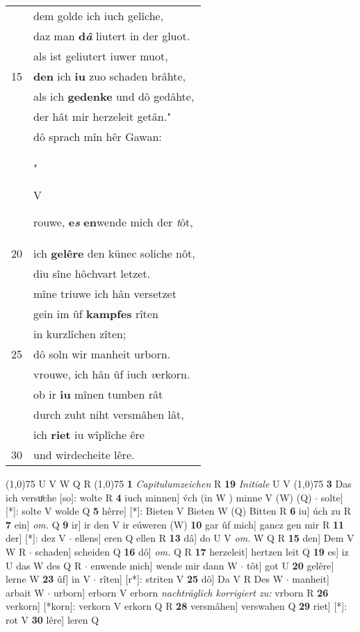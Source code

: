 \documentclass[8pt,a4paper,notitlepage]{article}
\begin{document}
\begin{table}[ht]
\begin{minipage}[t]{0.5\linewidth}
\begin{tabular}{rl}
 & dem golde ich iuch gelîche,\\ 
 & daz man \textbf{d\textit{â}} liutert in der gluot.\\ 
 & als ist geliutert iuwer muot,\\ 
15 & \textbf{den} ich \textbf{iu} zuo schaden brâhte,\\ 
 & als ich \textbf{gedenke} und dô gedâhte,\\ 
 & der hât mir herzeleit getân."\\ 
 & dô sprach mîn hêr Gawan:\\ 
 & "\begin{large}V\end{large}rouwe, \textbf{e\textit{s}} \textbf{en}wende mich der \textit{t}ôt,\\ 
20 & ich \textbf{gelêre} den künec soliche nôt,\\ 
 & diu sîne hôchvart letzet.\\ 
 & mîne triuwe ich hân versetzet\\ 
 & gein im ûf \textbf{kampfes} rîten\\ 
 & in kurzlîchen zîten;\\ 
25 & dô soln wir manheit urborn.\\ 
 & vrouwe, ich hân ûf iuch \textit{v}erkorn.\\ 
 & ob ir \textbf{iu} mînen tumben rât\\ 
 & durch zuht niht versmâhen lât,\\ 
 & ich \textbf{riet} iu wîplîche êre\\ 
30 & und wirdecheite lêre.\\ 
\end{tabular}
\scriptsize
\line(1,0){75} \newline
U V W Q R \newline
\line(1,0){75} \newline
\textbf{1} \textit{Capitulumzeichen} R  \textbf{19} \textit{Initiale} U V  \newline
\line(1,0){75} \newline
\textbf{3} Das ich versuͦche [so]: wolte R \textbf{4} iuch minnen] v́ch (in W ) minne V (W) (Q)  $\cdot$ solte] [*]: solte V wolde Q \textbf{5} hêrre] [*]: Bieten V Bieten W (Q) Bitten R \textbf{6} iu] úch zu R \textbf{7} ein] \textit{om.} Q \textbf{9} ir] ir den V ir eúweren (W) \textbf{10} gar ûf mich] gancz gen mir R \textbf{11} der] [*]: dez V  $\cdot$ ellens] eren Q ellen R \textbf{13} dâ] do U V \textit{om.} W Q R \textbf{15} den] Dem V W R  $\cdot$ schaden] scheiden Q \textbf{16} dô] \textit{om.} Q R \textbf{17} herzeleit] hertzen leit Q \textbf{19} es] iz U das W des Q R  $\cdot$ enwende mich] wende mir dann W  $\cdot$ tôt] got U \textbf{20} gelêre] lerne W \textbf{23} ûf] in V  $\cdot$ rîten] [r*]: striten V \textbf{25} dô] Da V R Des W  $\cdot$ manheit] arbait W  $\cdot$ urborn] erborn V erborn \textit{nachträglich korrigiert zu:} vrborn R \textbf{26} verkorn] [*korn]: verkorn V erkorn Q R \textbf{28} versmâhen] verswahen Q \textbf{29} riet] [*]: rot V \textbf{30} lêre] leren Q \newline
\end{minipage}
\end{table}
\end{document}
